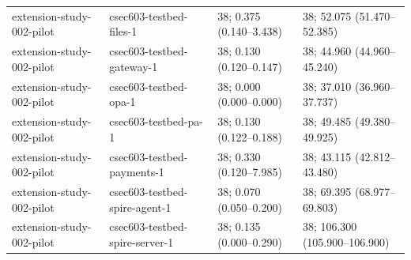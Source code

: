 \begin{tabular}{llll}
extension-study-002-pilot & csec603-testbed-files-1 & 38; 0.375 (0.140--3.438) & 38; 52.075 (51.470--52.385) \\
extension-study-002-pilot & csec603-testbed-gateway-1 & 38; 0.130 (0.120--0.147) & 38; 44.960 (44.960--45.240) \\
extension-study-002-pilot & csec603-testbed-opa-1 & 38; 0.000 (0.000--0.000) & 38; 37.010 (36.960--37.737) \\
extension-study-002-pilot & csec603-testbed-pa-1 & 38; 0.130 (0.122--0.188) & 38; 49.485 (49.380--49.925) \\
extension-study-002-pilot & csec603-testbed-payments-1 & 38; 0.330 (0.120--7.985) & 38; 43.115 (42.812--43.480) \\
extension-study-002-pilot & csec603-testbed-spire-agent-1 & 38; 0.070 (0.050--0.200) & 38; 69.395 (68.977--69.803) \\
extension-study-002-pilot & csec603-testbed-spire-server-1 & 38; 0.135 (0.000--0.290) & 38; 106.300 (105.900--106.900) \\
\hline
\end{tabular}
